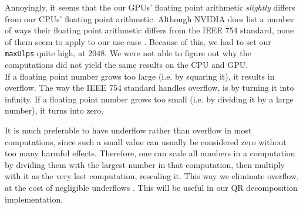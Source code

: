 Annoyingly, it seems that the our GPUs' floating point arithmetic \textit{slightly} differs from our CPUs' floating point arithmetic. Although NVIDIA does list a number of ways their floating point arithmetic differs from the IEEE 754 standard, none of them seem to apply to our use-case \cite[Sect. 13.1]{nvidia:cudadoc}. Because of this, we had to set our \texttt{maxUlps} quite high, at 2048. We were not able to figure out why the computations did not yield the same results on the CPU and GPU.\\

\noindent If a floating point number grows too large (i.e. by squaring it), it results in overflow. The way the IEEE 754 standard handles overflow, is by turning it into infinity. If a floating point number grows too small (i.e. by dividing it by a large number), it turns into zero. 

It is much preferable to have underflow rather than overflow in most computations, since such a small value can usually be considered zero without too many harmful effects. Therefore, one can scale all numbers in a computation by dividing them with the largest number in that computation, then multiply with it as the very last computation, rescaling it. This way we eliminate overflow, at the cost of negligible underflows \cite{afternotes}. This will be useful in our QR decomposition implementation.

